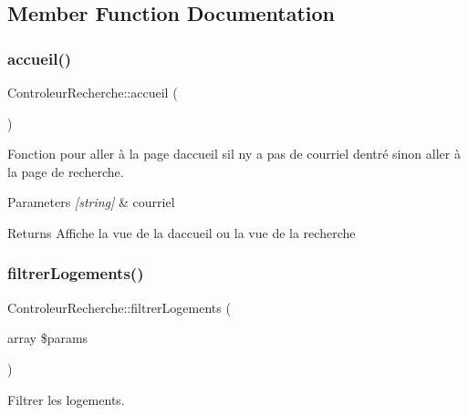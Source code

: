\subsection{Member Function Documentation}
\mbox{\label{class_controleur_recherche_a52e53a8e2a5fb1a427026efaf7ca10e8}} 
\subsubsection{\texorpdfstring{accueil()}{accueil()}}
{\footnotesize\ttfamily Controleur\+Recherche\+::accueil (\begin{DoxyParamCaption}{ }\end{DoxyParamCaption})}



Fonction pour aller à la page d\textquotesingle{}accueil s\textquotesingle{}il n\textquotesingle{}y a pas de courriel d\textquotesingle{}entré sinon aller à la page de recherche. 


\begin{DoxyParams}{Parameters}
{\em \mbox{[}string\mbox{]}} & courriel \\
\hline
\end{DoxyParams}
\begin{DoxyReturn}{Returns}
Affiche la vue de la d\textquotesingle{}accueil ou la vue de la recherche 
\end{DoxyReturn}
\mbox{\label{class_controleur_recherche_ad07ebc9827fffe54b425336b350ee038}} 
\subsubsection{\texorpdfstring{filtrer\+Logements()}{filtrerLogements()}}
{\footnotesize\ttfamily Controleur\+Recherche\+::filtrer\+Logements (\begin{DoxyParamCaption}\item[{array}]{\$params }\end{DoxyParamCaption})}



Filtrer les logements. 


